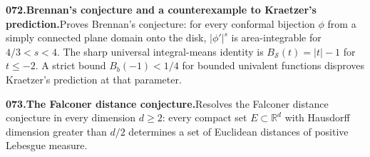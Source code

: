 \documentclass[11pt,a4paper]{article}
\begin{document}
  \par \begin{minipage}{\linewidth}
  \fontsize{10.5}{12.6}\selectfont\RaggedRight
  \hypertarget{result 072}{}
  {\bfseries\textcolor{muted}{072.}\enspace Brennan's conjecture and a counterexample to Kraetzer's prediction.}\enspace Proves Brennan's conjecture: for every conformal bijection $\phi$ from a simply connected plane domain onto the disk, $|\phi'|^s$ is area-integrable for $4/3<s<4$. The sharp universal integral-means identity is $B_{\mathcal S}(t)=|t|-1$ for $t\le-2$. A strict bound $B_b(-1)<1/4$ for bounded univalent functions disproves Kraetzer's prediction at that parameter.\par
  \end{minipage}\par\vspace{5pt}



  \par \begin{minipage}{\linewidth}
  \fontsize{10.5}{12.6}\selectfont\RaggedRight
  \hypertarget{result 073}{}
  {\bfseries\textcolor{muted}{073.}\enspace The Falconer distance conjecture.}\enspace Resolves the Falconer distance conjecture in every dimension $d\ge2$: every compact set $E\subset\mathbb R^d$ with Hausdorff dimension greater than $d/2$ determines a set of Euclidean distances of positive Lebesgue measure.\par
  \end{minipage}\par\vspace{5pt}
\end{document}
